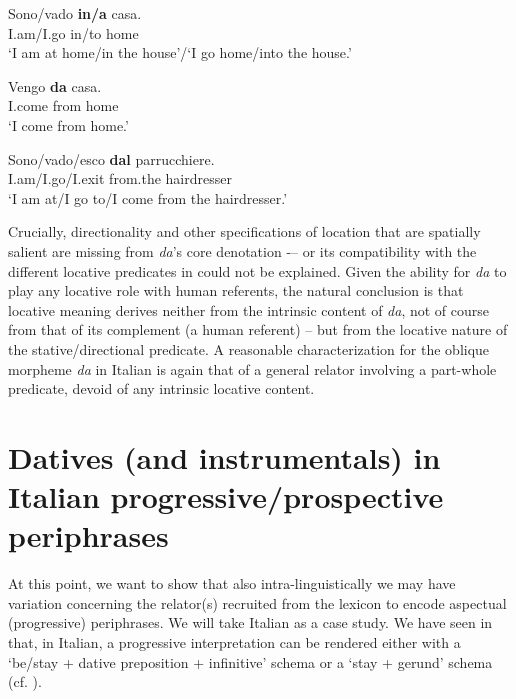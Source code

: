 \documentclass[output=paper,modfonts,nonflat,newtxmath,colorlinks,citecolor=brown]{langsci/langscibook}
\begin{document}
\ea%
    \label{ex:franco:20}
    \ea \label{ex:franco:20a}
    \gll Sono/vado \textbf{in/a} casa.\\
         I.am/I.go in/to home\\
    \glt ‘I am at home/in the house’/‘I go home/into the house.’

     \ex \label{ex:franco:20b}
    \gll Vengo \textbf{da} casa.\\
        I.come from home\\
    \glt ‘I come from home.’

    \ex \label{ex:franco:20c}
    \gll Sono/vado/esco \textbf{dal} parrucchiere.\\
        I.am/I.go/I.exit from.the hairdresser\\
    \glt ‘I am at/I go to/I come from the hairdresser.’
    \z
    \z


Crucially, directionality and other specifications of location that are spatially salient are missing from \textit{da}’s core denotation -– or its compatibility with the different locative predicates in  could not be explained. Given the ability for \textit{da} to play any locative role with human referents, the natural conclusion is that locative meaning derives neither from the intrinsic content of \textit{da}, not of course from that of its complement (a human referent) – but from the locative nature of the stative/directional predicate. A reasonable characterization for the oblique morpheme \textit{da} in Italian is again that of a general relator involving a part-whole predicate, devoid of any intrinsic locative content.

\section{Datives (and instrumentals) in Italian progressive/prospective periphrases}
\label{sec:franco:3}

At this point, we want to show that also intra-linguistically we may have variation concerning the relator(s) recruited from the lexicon to encode aspectual (progressive) periphrases. We will take Italian as a case study. We have seen in  that, in Italian, a progressive interpretation can be rendered either with a ‘be/stay + dative preposition + infinitive’ schema  or a ‘stay + gerund’  schema (cf. \citealt{Bertinetto2000}).
\end{document}

